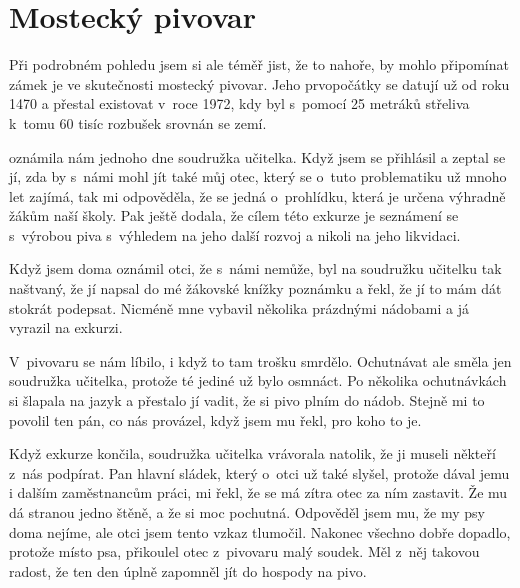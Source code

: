 
\chapter{Mostecký pivovar}


Při podrobném pohledu jsem si ale téměř jist, že to nahoře, by mohlo připomínat
zámek je ve skutečnosti mostecký pivovar. Jeho prvopočátky se datují už od roku
1470 a přestal existovat v~roce 1972, kdy byl s~pomocí 25 metráků střeliva
k~tomu 60 tisíc rozbušek srovnán se zemí.

 oznámila nám jednoho dne soudružka učitelka. Když jsem
se přihlásil a zeptal se jí, zda by s~námi mohl jít také můj otec, který se
o~tuto problematiku už mnoho let zajímá, tak mi odpověděla, že se jedná
o~prohlídku, která je určena výhradně žákům naší školy. Pak ještě dodala, že
cílem této exkurze je seznámení se s~výrobou piva s~výhledem na jeho další
rozvoj a nikoli na jeho likvidaci.

Když jsem doma oznámil otci, že s~námi nemůže, byl na soudružku učitelku tak
naštvaný, že jí napsal do mé žákovské knížky poznámku a řekl, že jí to mám dát
stokrát podepsat. Nicméně mne vybavil několika prázdnými nádobami a já vyrazil
na exkurzi.

V~pivovaru se nám líbilo, i když to tam trošku smrdělo. Ochutnávat ale směla
jen soudružka učitelka, protože té jediné už bylo osmnáct. Po několika
ochutnávkách si šlapala na jazyk a přestalo jí vadit, že si pivo plním do
nádob. Stejně mi to povolil ten pán, co nás provázel, když jsem mu řekl, pro
koho to je.

Když exkurze končila, soudružka učitelka vrávorala natolik, že ji museli
někteří z~nás podpírat. Pan hlavní sládek, který o~otci už také slyšel, protože
dával jemu i dalším zaměstnancům práci, mi řekl, že se má zítra otec za ním
zastavit. Že mu dá stranou jedno štěně, a že si moc pochutná. Odpověděl jsem
mu, že my psy doma nejíme, ale otci jsem tento vzkaz tlumočil. Nakonec všechno
dobře dopadlo, protože místo psa, přikoulel otec z~pivovaru malý soudek. Měl
z~něj takovou radost, že ten den úplně zapomněl jít do hospody na pivo.

